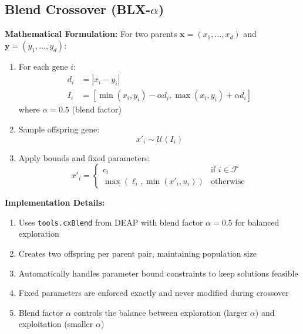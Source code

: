 \documentclass[12pt,a4paper]{article}
\begin{document}
\subsection{Blend Crossover (BLX-$\alpha$)}
\textbf{Mathematical Formulation:}
For two parents $\bm{x} = (x_1, \dots, x_d)$ and $\bm{y} = (y_1, \dots, y_d)$:
\begin{enumerate}
\item For each gene $i$:
\begin{align}
d_i &= |x_i - y_i| \label{eq:blx_distance} \\
I_i &= [\min(x_i, y_i) - \alpha d_i, \max(x_i, y_i) + \alpha d_i] \label{eq:blx_interval}
\end{align}
where $\alpha = 0.5$ (blend factor)

\item Sample offspring gene:
\begin{equation}
x'_i \sim \mathcal{U}(I_i) \label{eq:blx_sampling}
\end{equation}

\item Apply bounds and fixed parameters:
\begin{equation}
x'_i = \begin{cases}
c_i & \text{if } i \in \mathcal{F} \\
\max(\ell_i, \min(x'_i, u_i)) & \text{otherwise}
\end{cases} \label{eq:blx_bounds}
\end{equation}
\end{enumerate}

\textbf{Implementation Details:}
\begin{enumerate}
\item Uses \texttt{tools.cxBlend} from DEAP with blend factor $\alpha=0.5$ for balanced exploration
\item Creates two offspring per parent pair, maintaining population size
\item Automatically handles parameter bound constraints to keep solutions feasible
\item Fixed parameters are enforced exactly and never modified during crossover
\item Blend factor $\alpha$ controls the balance between exploration (larger $\alpha$) and exploitation (smaller $\alpha$)
\end{enumerate}
\end{document}
